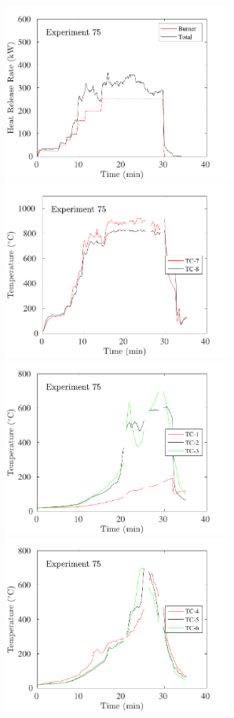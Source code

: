 \begin{figure}[H]
\includegraphics[height=2.30in]{../SCRIPT_FIGURES/Test_75_HRR} \hfill
\includegraphics[height=2.30in]{../SCRIPT_FIGURES/Test_75_TC_7-8} \\
\includegraphics[height=2.30in]{../SCRIPT_FIGURES/Test_75_TC_1-3} \hfill
\includegraphics[height=2.30in]{../SCRIPT_FIGURES/Test_75_TC_4-6}

\end{figure}
